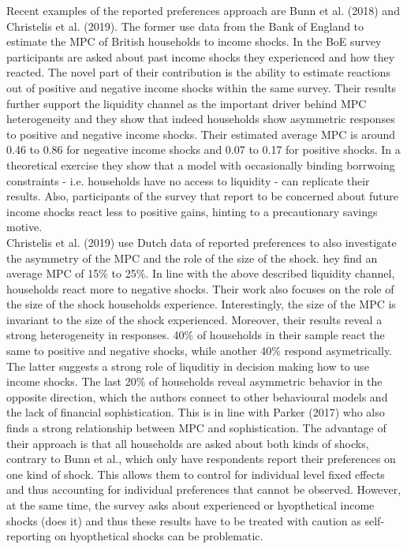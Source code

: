 Recent examples of the reported preferences approach are Bunn et al. (2018) and Christelis et al. (2019). The former use data from the Bank of England to estimate the MPC of British households to income shocks. In the BoE survey participants are asked about past income shocks they experienced and how they reacted. The novel part of their contribution is the ability to estimate reactions out of positive and negative income shocks within the same survey. Their results further support the liquidity channel as the important driver behind MPC heterogeneity and they show that indeed households show asymmetric responses to positive and negative income shocks. Their estimated average MPC is around 0.46 to 0.86 for negeative income shocks and 0.07 to 0.17 for positive shocks. In a theoretical exercise they show that a model with occasionally binding borrwoing constraints - i.e. households have no access to liquidity - can replicate their results. Also, participants of the survey that report to be concerned about future income shocks react less to positive gains, hinting to a precautionary savings motive. \\
Christelis et al. (2019) use Dutch data of reported preferences to also investigate the asymmetry of the MPC and the role of the size of the shock. hey find an average MPC of 15\% to 25\%. In line with the above described liquidity channel, households react more to negative shocks. Their work also focuses on the role of the size of the shock households experience. Interestingly, the size of the MPC is invariant to the size of the shock experienced. Moreover, their results reveal a strong heterogeneity in responses. 40\% of households in their sample react the same to positive and negative shocks, while another 40\% respond asymetrically. The latter suggests a strong role of liquditiy in decision making how to use income shocks. The last 20\% of households reveal asymmetric behavior in the opposite direction, which the authors connect to other behavioural models and the lack of financial sophistication. This is in line with Parker (2017) who also finds a strong relationship between MPC and sophistication. The advantage of their approach is that all households are asked about both kinds of shocks, contrary to Bunn et al., which only have respondents report their preferences on one kind of shock. This allows them to control for individual level fixed effects and thus accounting for individual preferences that cannot be observed. However, at the same time, the survey asks about experienced or hyopthetical income shocks (does it) and thus these results have to be treated with caution as self-reporting on hyopthetical shocks can be problematic. \\
